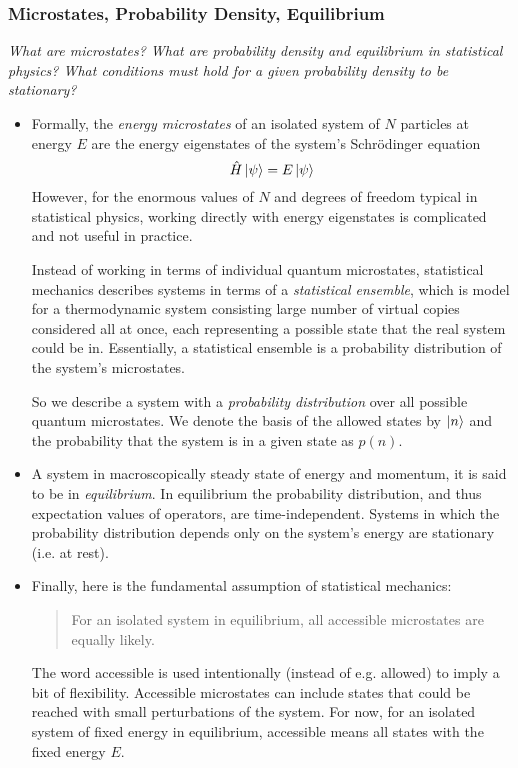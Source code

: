 \documentclass[11pt, a4paper]{article}
\begin{document}
\subsubsection{Microstates, Probability Density, Equilibrium}
\textit{What are microstates? What are probability density and equilibrium in statistical physics? What conditions must hold for a given probability density to be stationary?}
 
\begin{itemize}
	
	\item Formally, the \textit{energy microstates} of an isolated system of $ N $ particles at energy $ E $ are the energy eigenstates of the system's Schr\"{o}dinger equation 
	\begin{equation*}
		\hat{H}\ket{\psi} = E\ket{\psi}
	\end{equation*}
	However, for the enormous values of $ N $ and degrees of freedom typical in statistical physics, working directly with energy eigenstates is complicated and not useful in practice. 
	
	Instead of working in terms of individual quantum microstates, statistical mechanics describes systems in terms of a \textit{statistical ensemble}, which is model for a thermodynamic system consisting large number of virtual copies considered all at once, each representing a possible state that the real system could be in. Essentially, a statistical ensemble is a probability distribution of the system's microstates.
			
	So we describe a system with a \textit{probability distribution} over all possible quantum microstates.  We denote the basis of the allowed states by $ \ket{n} $ and the probability that the system is in a given state as $ p(n) $.
	
	\item A system in  macroscopically steady state of energy and momentum, it is said to be in \textit{equilibrium}. In equilibrium the probability distribution, and thus expectation values of operators, are time-independent. Systems in which the probability distribution depends only on the system's energy are stationary (i.e. at rest).
	
	\item Finally, here is the fundamental assumption of statistical mechanics:
	\begin{quote}
		For an isolated system in equilibrium, all accessible microstates are equally likely.
	\end{quote}
	The word accessible is used intentionally (instead of e.g. allowed) to imply a bit of flexibility. Accessible microstates can include states that could be reached with small perturbations of the system. For now, for an isolated system of fixed energy in equilibrium, accessible means all states with the fixed energy $ E $.
	

\end{itemize}
\end{document}
